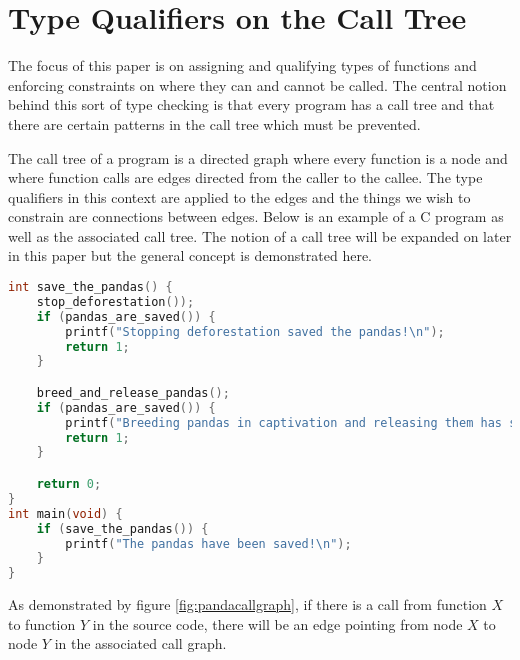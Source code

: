 \section{Type Qualifiers on the Call Tree}\label{sec:bac:calltree}

The focus of this paper is on assigning and qualifying types of functions and enforcing constraints on where they can and cannot be called.  The central notion behind this sort of type checking is that every program has a call tree and that there are certain patterns in the call tree which must be prevented.  

The call tree of a program is a directed graph where every function is a node and where function calls are edges directed from the caller to the callee.  The type qualifiers in this context are applied to the edges and the things we wish to constrain are connections between edges.  Below is an example of a C program as well as the associated call tree.  The notion of a call tree will be expanded on later in this paper but the general concept is demonstrated here.  

\begin{minipage}[c]{0.95\textwidth}
\begin{lstlisting}[language=C]
int save_the_pandas() {
	stop_deforestation());
	if (pandas_are_saved()) {
		printf("Stopping deforestation saved the pandas!\n");
		return 1;
	}

	breed_and_release_pandas();
	if (pandas_are_saved()) {
		printf("Breeding pandas in captivation and releasing them has saved the pandas!\n");
		return 1;
	}

	return 0;
}
int main(void) {
	if (save_the_pandas()) {
		printf("The pandas have been saved!\n");
	}
}
\end{lstlisting}
\end{minipage}



As demonstrated by figure \ref{fig:pandacallgraph}, if there is a call from function $X$ to function $Y$ in the source code, there will be an edge pointing from node $X$ to node $Y$ in the associated call graph. 
